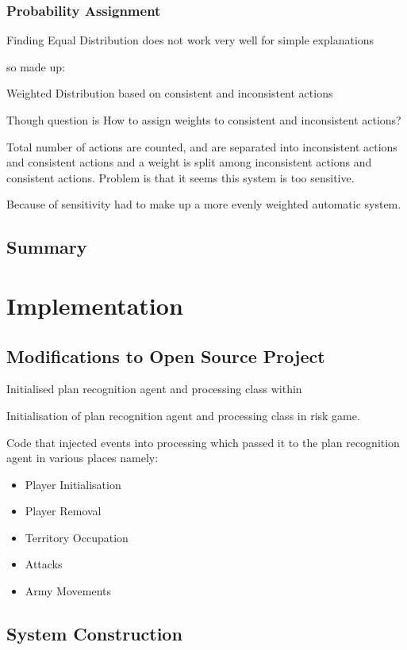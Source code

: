 \documentclass[parskip]{cs4rep}
\begin{document}
\subsubsection{Probability Assignment}

Finding
Equal Distribution does not work very well for simple explanations

so made up:

Weighted Distribution based on consistent and inconsistent actions

Though question is How to assign weights to consistent and inconsistent actions?

Total number of actions are counted, and are separated into inconsistent actions and consistent actions and a weight is split among inconsistent actions and consistent actions. Problem is that it seems this system is too sensitive.

Because of sensitivity had to make up a more evenly weighted automatic system.

\subsection{Summary}

\section{Implementation}

\subsection{Modifications to Open Source Project}

Initialised plan recognition agent and processing class within 

Initialisation of plan recognition agent and processing class in risk game.

Code that injected events into processing which passed it to the plan recognition agent in various places namely:

\begin{itemize}
\item
Player Initialisation
\item
Player Removal
\item
Territory Occupation
\item
Attacks
\item
Army Movements
\end{itemize}

\subsection{System Construction}
\end{document}

